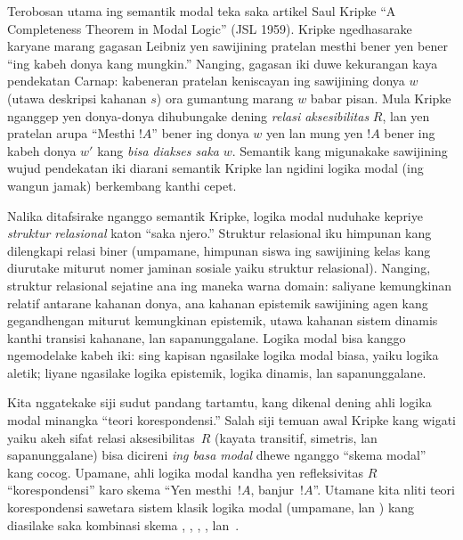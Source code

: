 \documentclass[../../../include/open-logic-section]{subfiles}
\begin{document}
Terobosan utama ing semantik modal teka saka artikel Saul
Kripke ``A Completeness Theorem in Modal Logic'' (JSL 1959). Kripke
ngedhasarake karyane marang gagasan Leibniz yen sawijining pratelan
mesthi bener yen bener ``ing kabeh donya kang mungkin.'' Nanging,
gagasan iki duwe kekurangan kaya pendekatan Carnap: kabeneran
pratelan keniscayan ing sawijining donya $w$ (utawa deskripsi kahanan $s$)
ora gumantung marang $w$ babar pisan. Mula Kripke nganggep yen
donya-donya dihubungake dening \emph{relasi aksesibilitas} $R$,
lan yen pratelan arupa ``Mesthi $!A$'' bener ing donya $w$ yen
lan mung yen $!A$ bener ing kabeh donya $w'$ kang \emph{bisa
diakses saka} $w$. Semantik kang migunakake sawijining wujud
pendekatan iki diarani semantik Kripke lan ngidini logika modal
(ing wangun jamak) berkembang kanthi cepet.

Nalika ditafsirake nganggo semantik Kripke, logika modal
nuduhake kepriye \emph{struktur relasional} katon ``saka njero.''
Struktur relasional iku himpunan kang dilengkapi relasi biner
(umpamane, himpunan siswa ing sawijining kelas kang diurutake miturut
nomer jaminan sosiale yaiku struktur relasional). Nanging,
struktur relasional sejatine ana ing maneka warna domain: saliyane
kemungkinan relatif antarane kahanan donya, ana kahanan epistemik
sawijining agen kang gegandhengan miturut kemungkinan epistemik,
utawa kahanan sistem dinamis kanthi transisi kahanane, lan
sapanunggalane. Logika modal bisa kanggo ngemodelake kabeh iki:
sing kapisan ngasilake logika modal biasa, yaiku logika aletik;
liyane ngasilake logika epistemik, logika dinamis, lan sapanunggalane.

Kita nggatekake siji sudut pandang tartamtu, kang dikenal
dening ahli logika modal minangka ``teori korespondensi.'' Salah siji
temuan awal Kripke kang wigati yaiku akeh sifat relasi
aksesibilitas~$R$ (kayata transitif, simetris, lan sapanunggalane)
bisa dicireni \emph{ing basa modal} dhewe nganggo ``skema modal''
kang cocog. Upamane, ahli logika modal kandha yen refleksivitas
$R$ ``korespondensi'' karo skema ``Yen mesthi~$!A$, banjur~$!A$''.
Utamane kita nliti teori korespondensi sawetara sistem klasik
logika modal (umpamane,  lan ) kang diasilake saka
kombinasi skema , , , , lan~.
\end{document}
